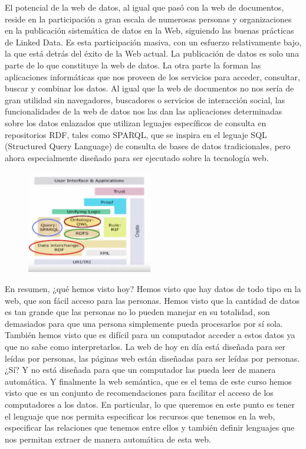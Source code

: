 El potencial de la web de datos, al igual que pasó con la web de documentos, reside en la participación a gran escala de numerosas personas y organizaciones en la publicación sistemática de datos en la Web, siguiendo las buenas prácticas de Linked Data. Es esta participación masiva, con un esfuerzo relativamente bajo, la que está detrás del éxito de la Web actual. La publicación de datos es solo una parte de lo que constituye la web de datos. La otra parte la forman las aplicaciones informáticas que nos proveen de los servicios para acceder, consultar, buscar y combinar los datos. Al igual que la web de documentos no nos sería de gran utilidad sin navegadores, buscadores o servicios de interacción social, las funcionalidades de la web de datos nos las dan las aplicaciones determinadas sobre los datos enlazados que utilizan leguajes específicos de consulta en repositorios RDF, tales como SPARQL, que se inspira en el leguaje SQL (Structured Query Language) de consulta de bases de datos tradicionales, pero ahora especialmente diseñado para ser ejecutado sobre la tecnología web. %

\begin{figure}[H]
	\centering
	\includegraphics[height=4.5cm]{imagenes/capitulo3/9}
	\caption{}
\end{figure}

En resumen, ¿qué hemos visto hoy? Hemos visto que hay datos de todo tipo en la web, que son fácil acceso para las personas. Hemos visto que la cantidad de datos es tan grande que las personas no lo pueden manejar en su totalidad, son demasiados para que una persona simplemente pueda procesarlos por sí sola. También hemos visto que es difícil para un computador acceder a estos datos ya que no sabe como interpretarlos. La web de hoy en día está diseñada para ser leídas por personas, las páginas web están diseñadas para ser leídas por personas. ¿Sí? Y no está diseñada para que un computador las pueda leer de manera automática. Y finalmente la web semántica, que es el tema de este curso hemos visto que es un conjunto de recomendaciones para facilitar el acceso de los computadores a los datos. En particular, lo que queremos en este punto es tener el lenguaje que nos permita especificar los recursos que tenemos en la web, especificar las relaciones que tenemos entre ellos y también definir lenguajes que nos permitan extraer de manera automática de esta web.

